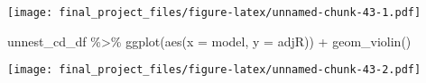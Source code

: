 \documentclass[
]{article}
\newenvironment{Shaded}{\begin{snugshade}}{\end{snugshade}}
\newcommand{\AttributeTok}[1]{\textcolor[rgb]{0.77,0.63,0.00}{#1}}
\newcommand{\FunctionTok}[1]{\textcolor[rgb]{0.00,0.00,0.00}{#1}}
\newcommand{\NormalTok}[1]{#1}
\newcommand{\SpecialCharTok}[1]{\textcolor[rgb]{0.00,0.00,0.00}{#1}}
\begin{document}
\texttt{[image: final\_project\_files/figure-latex/unnamed-chunk-43-1.pdf]}

\begin{Shaded}
\begin{Highlighting}[]
\NormalTok{unnest\_cd\_df }\SpecialCharTok{\%\textgreater{}\%} \FunctionTok{ggplot}\NormalTok{(}\FunctionTok{aes}\NormalTok{(}\AttributeTok{x =}\NormalTok{ model, }\AttributeTok{y =}\NormalTok{ adjR)) }\SpecialCharTok{+} \FunctionTok{geom\_violin}\NormalTok{() }
\end{Highlighting}
\end{Shaded}

\texttt{[image: final\_project\_files/figure-latex/unnamed-chunk-43-2.pdf]}
\end{document}
